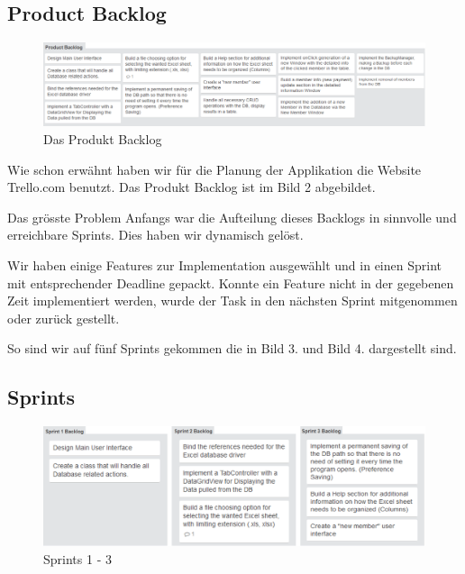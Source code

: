 \documentclass{article}
\begin{document}
\subsection{Product Backlog}
\begin{figure}[h]
		\begin{center}
			\centering
			\includegraphics[width=0.8\paperwidth]{ProductBacklog1}
			\caption{Das Produkt Backlog}
		\end{center}
	\end{figure}
	
Wie schon erwähnt haben wir für die Planung der Applikation die Website Trello.com benutzt. Das Produkt Backlog ist im Bild 2 abgebildet.

Das grösste Problem Anfangs war die Aufteilung dieses Backlogs in sinnvolle und erreichbare Sprints. Dies haben wir dynamisch gelöst.

Wir haben einige Features zur Implementation ausgewählt und in einen Sprint mit entsprechender Deadline gepackt. Konnte ein Feature nicht in der gegebenen Zeit implementiert werden, wurde der Task in den nächsten Sprint mitgenommen oder zurück gestellt.

So sind wir auf fünf Sprints gekommen die in Bild 3. und Bild 4. dargestellt sind.

\newpage


\subsection{Sprints}
\begin{figure}[h]
	\centering 
	\includegraphics[width=0.6\paperwidth]{Sprint1-3}
	\caption{Sprints 1 - 3}
\end{figure}
\end{document}
